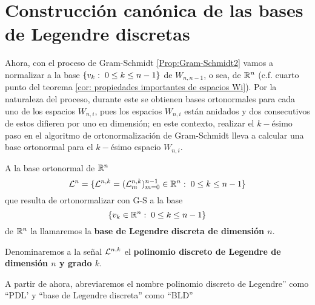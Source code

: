 \section{Construcción canónica de las bases de Legendre discretas}

\noindent Ahora, con el proceso de Gram-Schmidt \ref{Prop:Gram-Schmidt2}
vamos a normalizar
a la base $\{v_{k}: \hspace{0.1cm} 0 \leq k \leq n-1 \}$ de
$W_{n,n-1}$, o sea, de $\mathbb{R}^{n}$ (c.f. 
cuarto punto del teorema
\ref{cor: propiedades importantes de espacios Wi}). 
Por la naturaleza del proceso, durante este se
obtienen bases ortonormales para cada uno de los espacios 
$W_{n,i}$, pues los espacios $W_{n,i}$ están anidados y dos consecutivos
de estos difieren por uno en dimensión; en este contexto, realizar
el $k-$ésimo paso en el algoritmo de ortonormalización de Gram-Schmidt
lleva a calcular una base ortonormal para el $k-$ésimo espacio $W_{n,i}$.




\begin{defi} 
\label{def: base de Legendre discreta}
A la base ortonormal de $\mathbb{R}^{n}$
\begin{equation}
\label{eq: base de Legendre discreta}
\mathcal{L}^{n}=\{ \mathcal{L}^{n,k}= (\mathcal{L}_{m}^{n,k})_{m=0}^{n-1} \in \mathbb{R}^{n}: 
\hspace{0.1cm} 0 \leq k \leq n-1\}
\end{equation}
que resulta de ortonormalizar con G-S a la base
\[
\{v_{k} \in \mathbb{R}^{n}: \hspace{0.1cm} 0 \leq k \leq n-1 \}
\]
de $\mathbb{R}^{n}$ la llamaremos la
\textbf{base de Legendre discreta de dimensión $n$}.

Denominaremos a la señal $\mathcal{L}^{n,k}$ el 
\textbf{polinomio discreto de Legendre de dimensión
$n$ y grado $k$}.
\end{defi}

\begin{nota}
A partir de ahora, abreviaremos el nombre
polinomio discreto de Legendre''
como ``PDL' y ``base de Legendre discreta'' como ``BLD''
\end{nota}

